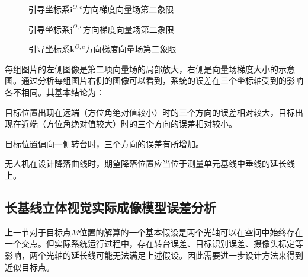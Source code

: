 \begin{figure}[htb]
	\centering
	 \qquad
	\caption{引导坐标系$\mathbf{i}^{O,c}$方向梯度向量场第二象限}
	\label{fig:chp03_vision_06_glide_3_x_with_theta_l_r_2_quadrant}
\end{figure}

\begin{figure}[htb]
	\centering
	 \qquad
	\caption{引导坐标系$\mathbf{j}^{O,c}$方向梯度向量场第二象限}
	\label{fig:chp03_vision_07_glide_3_y_with_theta_l_r_2_quadrant}
\end{figure}

\begin{figure}[htb]
	\centering
	 \qquad
	\caption{引导坐标系$\mathbf{k}^{O,c}$方向梯度向量场第二象限}
	\label{fig:chp03_vision_08_glide_3_z_with_theta_l_r_2_quadrant}
\end{figure}

每组图片的左侧图像是第二项向量场的局部放大，右侧是向量场梯度大小的示意图。通过分析每组图片右侧的图像可以看到，系统的误差在三个坐标轴受到的影响各不相同。其基本结论为：

\begin{compactenum}
	\item
	目标位置出现在远端（方位角绝对值较小）时的三个方向的误差相对较大，目标出现在近端（方位角绝对值较大）时的三个方向的误差相对较小。
	\item
	目标位置偏向一侧转台时，三个方向的误差有所增加。
	\item
	无人机在设计降落曲线时，期望降落位置应当位于测量单元基线中垂线的延长线上。
\end{compactenum}



\subsection{长基线立体视觉实际成像模型误差分析}
上一节对于目标点$M$位置的解算的一个基本假设是两个光轴可以在空间中始终存在一个交点。但实际系统运行过程中，存在转台误差、目标识别误差、摄像头标定等影响，两个光轴的延长线可能无法满足上述假设。因此需要进一步设计方法来得到近似目标点。

